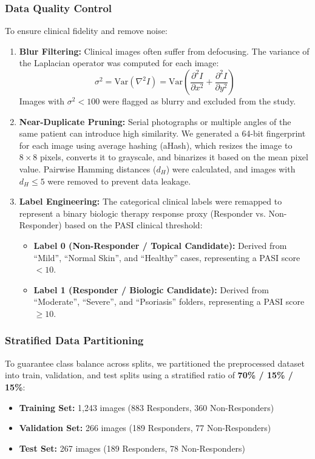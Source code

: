 \documentclass[11pt,journal,compsoc]{IEEEtran}
\begin{document}
\subsubsection{Data Quality Control}
To ensure clinical fidelity and remove noise:
\begin{enumerate}
    \item \textbf{Blur Filtering:} Clinical images often suffer from defocusing. The variance of the Laplacian operator was computed for each image:
    \begin{equation}
    \sigma^2 = \text{Var}(\nabla^2 I) = \text{Var}\left(\frac{\partial^2 I}{\partial x^2} + \frac{\partial^2 I}{\partial y^2}\right)
    \end{equation}
    Images with $\sigma^2 < 100$ were flagged as blurry and excluded from the study.
    \item \textbf{Near-Duplicate Pruning:} Serial photographs or multiple angles of the same patient can introduce high similarity. We generated a 64-bit fingerprint for each image using average hashing (aHash), which resizes the image to $8 \times 8$ pixels, converts it to grayscale, and binarizes it based on the mean pixel value. Pairwise Hamming distances ($d_H$) were calculated, and images with $d_H \le 5$ were removed to prevent data leakage.
    \item \textbf{Label Engineering:} The categorical clinical labels were remapped to represent a binary biologic therapy response proxy (Responder vs. Non-Responder) based on the PASI clinical threshold:
    \begin{itemize}
        \item \textbf{Label 0 (Non-Responder / Topical Candidate):} Derived from ``Mild'', ``Normal Skin'', and ``Healthy'' cases, representing a PASI score $< 10$.
        \item \textbf{Label 1 (Responder / Biologic Candidate):} Derived from ``Moderate'', ``Severe'', and ``Psoriasis'' folders, representing a PASI score $\ge 10$.
    \end{itemize}
\end{enumerate}

\subsubsection{Stratified Data Partitioning}
To guarantee class balance across splits, we partitioned the preprocessed dataset into train, validation, and test splits using a stratified ratio of \textbf{70\% / 15\% / 15\%}:
\begin{itemize}
    \item \textbf{Training Set:} 1,243 images (883 Responders, 360 Non-Responders)
    \item \textbf{Validation Set:} 266 images (189 Responders, 77 Non-Responders)
    \item \textbf{Test Set:} 267 images (189 Responders, 78 Non-Responders)
\end{itemize}
\end{document}
